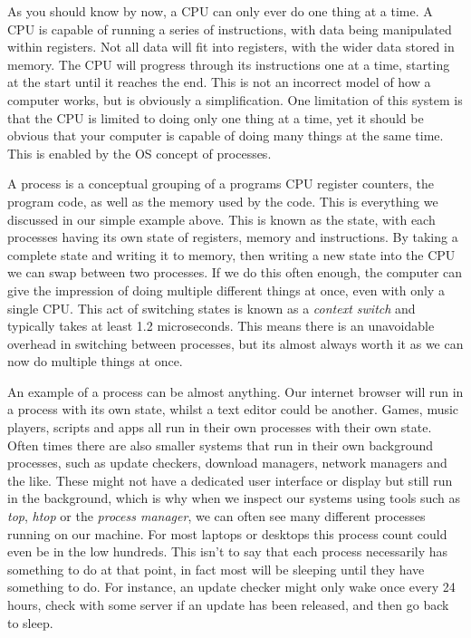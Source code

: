 As you should know by now, a CPU can only ever do one thing at a time. A CPU is capable of running a series of instructions, with data being manipulated within registers. Not all data will fit into registers, with the wider data stored in memory. The CPU will progress through its instructions one at a time, starting at the start until it reaches the end. This is not an incorrect model of how a computer works, but is obviously a simplification. One limitation of this system is that the CPU is limited to doing only one thing at a time, yet it should be obvious that your computer is capable of doing many things at the same time. This is enabled by the OS concept of processes.

A process is a conceptual grouping of a programs CPU register counters, the program code, as well as the memory used by the code. This is everything we discussed in our simple example above. This is known as the state, with each processes having its own state of registers, memory and instructions. By taking a complete state and writing it to memory, then writing a new state into the CPU we can swap between two processes. If we do this often enough, the computer can give the impression of doing multiple different things at once, even with only a single CPU. This act of switching states is known as a \textit{context switch} and typically takes at least 1.2 microseconds. This means there is an unavoidable overhead in switching between processes, but its almost always worth it as we can now do multiple things at once.

An example of a process can be almost anything. Our internet browser will run in a process with its own state, whilst a text editor could be another. Games, music players, scripts and apps all run in their own processes with their own state. Often times there are also smaller systems that run in their own background processes, such as update checkers, download managers, network managers and the like. These might not have a dedicated user interface or display but still run in the background, which is why when we inspect our systems using tools such as \textit{top}, \textit{htop} or the \textit{process manager}, we can often see many different processes running on our machine. For most laptops or desktops this process count could even be in the low hundreds. This isn't to say that each process necessarily has something to do at that point, in fact most will be sleeping until they have something to do. For instance, an update checker might only wake once every 24 hours, check with some server if an update has been released, and then go back to sleep. 

